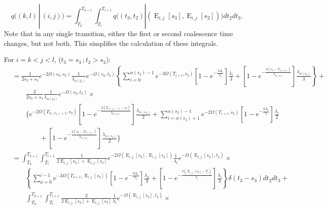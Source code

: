 \documentclass{article}
\DeclareMathOperator{\E}{E}
\begin{document}

\begin{equation}
    q\Big((k,l)\,|\,(i,j)\Big) = 
    \int_{T_k}^{T_{k+1}}\int_{T_l}^{T_{l+1}}q\Big((t_3,t_2)|\left(\E_{i,j}[s_3],\E_{i,j}[s_2]\right)\Big)dt_2dt_3.
\end{equation}
Note that in any single transition, either the first or second coalescence time
changes, but not both. This simplifies the calculation of these integrals.

For $i=k< j<l$, ($t_3=s_3\,;t_2>s_2$):
\begin{align*}
    &=\frac{1}{2s_2+s_3}e^{-2\Omega(s_3,s_2)}\frac{1}{\lambda_{\alpha(t_2)}}e^{-\Omega(s_2,t_2)}
    \left\{\sum_{i=0}^{\alpha(s_3)-1}e^{-3\Omega(T_{i+1},s_3)}
        \left[1-e^{-\frac{3\Delta_i}{\lambda_i}}\right]\frac{\lambda_i}{3}+
    \left[1-e^{-\frac{3\left(s_3-T_{\alpha(s_3)}\right)}{\lambda_{\alpha(s_3)}}}\right]
        \frac{\lambda_{\alpha(s_3)}}{3}\right\}+\\
    &\qquad\frac{2}{2s_2+s_3}\frac{1}{\lambda_{\alpha(t_2)}}e^{-\Omega(s_2,t_2)}\times\\
    &\qquad\Bigg\{e^{-2\Omega(T_{\alpha(s_3)+1},s_2)}\left[1-e^{-\frac{2\left(T_{\alpha(s_3)+1}-s_3\right)}{\lambda_{\alpha(s_3)}}}\right]\frac{\lambda_{\alpha(s_3)}}{2}+\sum_{i=\alpha(s_3)+1}^{\alpha(s_2)-1}e^{-2\Omega\left(T_{i+1},s_2\right)}\left[1-e^{-\frac{2\Delta_i}{\lambda_i}}\right]\frac{\lambda_i}{2}\\
    &\qquad\qquad+\left[1-e^{-\frac{2\left(s_2-T_{\alpha(s_2)}\right)}{\lambda_{\alpha(s_2)}}}\right]\frac{\lambda_{\alpha(s_2)}}{2}
    \Bigg\}
    \\
    &=\int_{T_k}^{T_{k+1}}\int_{T_l}^{T_{l+1}}\frac{1}{2\E_{i,j}[s_2]+\E_{i,j}[s_3]}e^{-2\Omega(\E_{i,j}[s_3],\E_{i,j}[s_2])}\frac{1}{\lambda_l}e^{-\Omega(\E_{i,j}[s_2],t_2)}\times\\
    &\qquad\left\{\sum_{a=0}^{i-1}e^{-3\Omega(T_{a+1},\E_{i,j}[s_3])}
        \left[1-e^{-\frac{3\Delta_a}{\lambda_a}}\right]\frac{\lambda_a}{3}+
    \left[1-e^{-\frac{3\left(\E_{i,j}[s_3]-T_i\right)}{\lambda_i}}\right]
    \frac{\lambda_i}{3}\right\}\delta(t_3-s_3)dt_2dt_3+\\
    &\qquad\int_{T_k}^{T_{k+1}}\int_{T_l}^{T_{l+1}}
        \frac{2}{2\E_{i,j}[s_2]+\E_{i,j}[s_3]}\frac{1}{\lambda_l}e^{-\Omega(\E_{i,j}[s_2],t_2)}\times\\

\end{align*}
\end{document}
